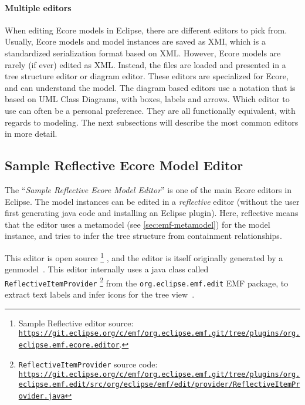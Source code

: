 \paragraph{Multiple editors}
When editing \gls{Ecore} models in \gls{Eclipse}, there are different editors to pick from.
Usually, \gls{Ecore} models and model instances are saved as \acrfull{XMI}, which is a standardized serialization format based on XML.
However, \gls{Ecore} models are rarely (if ever) edited as XML.
Instead, the files are loaded and presented in a tree structure editor or diagram editor.
These editors are specialized for \gls{Ecore}, and can understand the model.
The diagram based editors use a notation that is based on \gls{UML} Class Diagrams, with boxes, labels and arrows.
Which editor to use can often be a personal preference.
They are all functionally equivalent, with regards to modeling.
The next subsections will describe the most common editors in more detail.

\subsection{Sample Reflective Ecore Model Editor}\label{sec:sample-reflective-editor}

The ``\textit{Sample Reflective Ecore Model Editor}'' is one of the main \gls{Ecore} editors in \gls{Eclipse}.
The model instances can be edited in a \textit{reflective} editor (without the user first generating java code and installing an \gls{Eclipse} plugin).
Here, reflective means that the editor uses a metamodel (see \cref{sec:emf-metamodel}) for the model instance, and tries to infer the tree structure from containment relationships.


This editor is \gls{open source}%
\footnote{Sample Reflective editor source: \href{https://git.eclipse.org/c/emf/org.eclipse.emf.git/tree/plugins/org.eclipse.emf.ecore.editor}{\nolinkurl{https://git.eclipse.org/c/emf/org.eclipse.emf.git/tree/plugins/org.eclipse.emf.ecore.editor}}.}%
, and the editor is itself originally generated by a genmodel~\cite[p.~10]{rekstadModelingEnvironmentCloud2020}.
This editor internally uses a java class called \texttt{ReflectiveItemProvider}%
\footnote{\texttt{ReflectiveItemProvider} source code: \href{https://git.eclipse.org/c/emf/org.eclipse.emf.git/tree/plugins/org.eclipse.emf.edit/src/org/eclipse/emf/edit/provider/ReflectiveItemProvider.java}{\nolinkurl{https://git.eclipse.org/c/emf/org.eclipse.emf.git/tree/plugins/org.eclipse.emf.edit/src/org/eclipse/emf/edit/provider/ReflectiveItemProvider.java}}}
from the \texttt{org.eclipse.emf.edit} \acrshort{EMF} package, to extract text labels and infer icons for the tree view~\cite[p.~10]{rekstadModelingEnvironmentCloud2020}.

